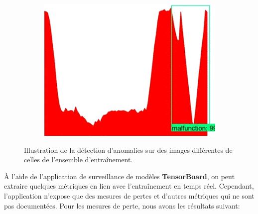\documentclass[french]{article}
\theoremstyle{mytheoremstyle}
\theoremstyle{mytheoremstyle}
\theoremstyle{myproblemstyle}
\begin{document}
\begin{figure}[H]
\begin{subfigure}[t]{0.3\textwidth}
            \includegraphics[width=1\textwidth]{images/od_3.png}
    \end{subfigure}
    \caption{Illustration de la détection d'anomalies sur des images différentes de celles de l'ensemble d'entraînement.}
    \end{figure}

    À l'aide de l'application de surveillance de modèles \textbf{TensorBoard}, on peut extraire quelques métriques en lien avec l'entraînement en temps réel. Cependant, l'application n'expose que des mesures de pertes et d'autres métriques qui ne sont pas documentées. Pour les mesures de perte, nous avons les résultats suivant:
    
\end{document}
